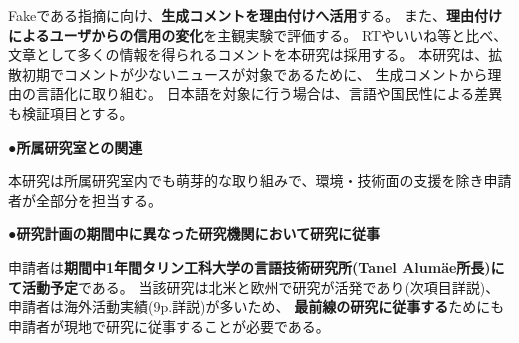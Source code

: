 {	Fakeである指摘に向け、\textbf{生成コメントを理由付けへ活用}する。
	また、\textbf{理由付けによるユーザからの信用の変化}を主観実験で評価する。
	RTやいいね等と比べ、文章として多くの情報を得られるコメントを本研究は採用する。
	本研究は、拡散初期でコメントが少ないニュースが対象であるために、
	⽣成コメントから理由の⾔語化に取り組む。
	⽇本語を対象に⾏う場合は、⾔語や国⺠性による差異も検証項⽬とする。

	\noindent
	●\textbf{所属研究室との関連}

	本研究は所属研究室内でも萌芽的な取り組みで、環境・技術面の支援を除き申請者が全部分を担当する。

	\noindent
	●\textbf{研究計画の期間中に異なった研究機関において研究に従事}
	
	申請者は\textbf{期間中1年間タリン工科大学の言語技術研究所(Tanel Alumäe所長)にて活動予定}である。
	当該研究は北米と欧州で研究が活発であり(次項目詳説)、申請者は海外活動実績(9p.詳説)が多いため、
	\textbf{最前線の研究に従事する}ためにも申請者が現地で研究に従事することが必要である。

}

\newcommand{\人権の保護及び法令等の遵守への対応}{%
	コメント取得を予定してしているSNSはTwitterである。
	Twitter社は2020年3月より学術目的でTwitter APIの利用を自由化しているほか、
	取得したツイートIDを含む情報をデータセットとして公開することも学術目的であれば認められている\cite{twitter_2020}。

	また、先行研究が提供したデータセットを使用する場合は、提供者が示しているライセンスやポリシーを遵守する。

	なお、学習済みモデルの公表は平成30年改正著作権法第30条4号により認められている。

	ただし、本研究では主観評価実験としてSNSユーザを対象としたアンケート調査を予定している。
	この調査により収集したデータは、個⼈の特定につながる情報を匿名化した上で解析を⾏い、
	解析結果の公表に際しては、匿名化を⾏ったデータを⽤い、個⼈情報の漏洩防⽌に配慮する。

	{\footnotesize
		\begin{thebibliography}{99}
			\setcounter{enumiv}{11}
			\bibitem{twitter_2020} Twitter開発者ポリシーを分かりやすくアップデート, 2020年3月11日. (最終閲覧日 2020年4月19日) \url{https://blog.twitter.com/developer/ja_jp/topics/tools/2020/DevPolicyUpdate.html}
		\end{thebibliography}
	}
}

